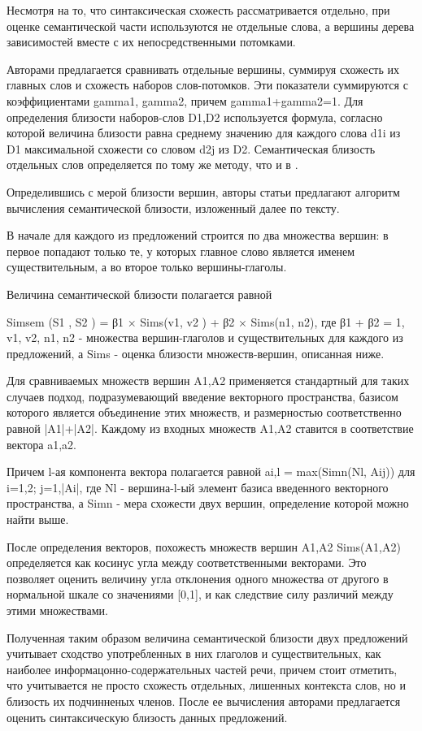 Несмотря на то, что синтаксическая схожесть рассматривается отдельно, 
при оценке семантической части используются не отдельные слова, а
вершины дерева зависимостей вместе с их непосредственными потомками.

Авторами предлагается сравнивать отдельные вершины, суммируя схожесть их главных слов
и схожесть наборов слов-потомков. Эти показатели суммируются с коэффициентами gamma1, gamma2, причем gamma1+gamma2=1.
Для определения близости наборов-слов D1,D2 используется формула, согласно которой
величина близости равна среднему значению для каждого слова d1i из D1 максимальной схожести
со словом d2j из D2. 
Семантическая близость отдельных слов определяется по тому же методу, что и в \cite{wordnetSim}.

Определившись с мерой близости вершин, авторы статьи предлагают 
алгоритм вычисления семантической близости, изложенный далее по тексту.

В начале для каждого из предложений строится по два множества вершин:
в первое попадают только те, у которых главное слово является именем существительным,
а во второе только вершины-глаголы.

Величина семантической близости полагается равной

Simsem (S1 , S2 ) = β1 × Sims(v1, v2 ) + β2 × Sims(n1, n2), где 
β1 + β2 = 1, 
v1, v2, n1, n2 - множества вершин-глаголов и существительных для каждого из предложений,
а Sims - оценка близости множеств-вершин, описанная ниже.

Для сравниваемых множеств вершин A1,A2 применяется стандартный для таких случаев подход,
подразумевающий введение векторного пространства, базисом которого является объединение этих множеств,
и размерностью соответственно равной |A1|+|A2|.  
Каждому из входных множеств A1,A2 ставится в соответствие вектора a1,a2.

Причем l-ая компонента вектора полагается равной 
ai,l = max(Simn(Nl, Aij)) 
для i=1,2; j=1,|Ai|,
где Nl - вершина-l-ый элемент базиса введенного векторного пространства,
а Simn - мера схожести двух вершин, определение которой можно найти выше.

После определения векторов, похожесть множеств вершин A1,A2 Sims(A1,A2) определяется
как косинус угла между соответственными векторами. 
Это позволяет оценить величину угла отклонения одного множества от другого в нормальной шкале
со значениями [0,1], и как следствие силу различий между этими множествами.

Полученная таким образом величина семантической близости двух предложений
учитывает сходство употребленных в них глаголов и существительных,
как наиболее информацонно-содержательных частей речи, 
причем стоит отметить, что учитывается не просто схожесть 
отдельных, лишенных контекста слов, но и близость их 
подчинненых членов. После ее вычисления авторами предлагается оценить
синтаксическую близость данных предложений.

